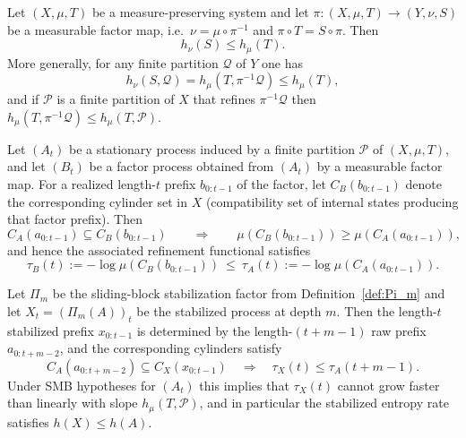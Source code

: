 \begin{proposition}\label{prop:entropy-factor-monotone}
Let $(X,\mu,T)$ be a measure-preserving system and let $\pi:(X,\mu,T)\to (Y,\nu,S)$ be a measurable factor map, i.e.\ $\nu=\mu\circ\pi^{-1}$ and $\pi\circ T=S\circ\pi$. Then
\[
h_\nu(S)\le h_\mu(T).
\]
More generally, for any finite partition $\mathcal{Q}$ of $Y$ one has
\[
h_\nu(S,\mathcal{Q}) = h_\mu(T,\pi^{-1}\mathcal{Q}) \le h_\mu(T),
\]
and if $\mathcal{P}$ is a finite partition of $X$ that refines $\pi^{-1}\mathcal{Q}$ then $h_\mu(T,\pi^{-1}\mathcal{Q})\le h_\mu(T,\mathcal{P})$.
\cite{Walters1982,Petersen1983}
\end{proposition}

\begin{proposition}\label{prop:tau-factor-monotone}
Let $(A_t)$ be a stationary process induced by a finite partition $\mathcal{P}$ of $(X,\mu,T)$, and let $(B_t)$ be a factor process obtained from $(A_t)$ by a measurable factor map. For a realized length-$t$ prefix $b_{0:t-1}$ of the factor, let $C_B(b_{0:t-1})$ denote the corresponding cylinder set in $X$ (compatibility set of internal states producing that factor prefix). Then
\[
C_A(a_{0:t-1})\subseteq C_B(b_{0:t-1})\qquad\Rightarrow\qquad
\mu(C_B(b_{0:t-1}))\ge \mu(C_A(a_{0:t-1})),
\]
and hence the associated refinement functional satisfies
\[
\tau_B(t):=-\log\mu(C_B(b_{0:t-1}))\ \le\ \tau_A(t):=-\log\mu(C_A(a_{0:t-1})).
\]
\end{proposition}

\begin{corollary}\label{cor:tau-blockcode}
Let $\Pi_m$ be the sliding-block stabilization factor from Definition~\ref{def:Pi_m} and let $X_t=(\Pi_m(A))_t$ be the stabilized process at depth $m$. Then the length-$t$ stabilized prefix $x_{0:t-1}$ is determined by the length-$(t+m-1)$ raw prefix $a_{0:t+m-2}$, and the corresponding cylinders satisfy
\[
C_A(a_{0:t+m-2})\subseteq C_X(x_{0:t-1})\quad\Rightarrow\quad
\tau_X(t)\le \tau_A(t+m-1).
\]
Under SMB hypotheses for $(A_t)$ this implies that $\tau_X(t)$ cannot grow faster than linearly with slope $h_\mu(T,\mathcal{P})$, and in particular the stabilized entropy rate satisfies $h(X)\le h(A)$.
\end{corollary}

